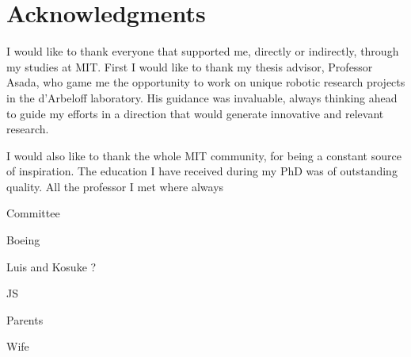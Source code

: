 \section*{Acknowledgments}

I would like to thank everyone that supported me, directly or indirectly, through my studies at MIT. First I would like to thank my thesis advisor, Professor Asada, who game me the opportunity to work on unique robotic research projects in the d'Arbeloff laboratory. His guidance was invaluable, always thinking ahead to guide my efforts in a direction that would generate innovative and relevant research. 

I would also like to thank the whole MIT community, for being a constant source of inspiration. The education I have received during my PhD was of outstanding quality. All the professor I met where always 

Committee

Boeing

Luis and Kosuke ?

JS

Parents

Wife
